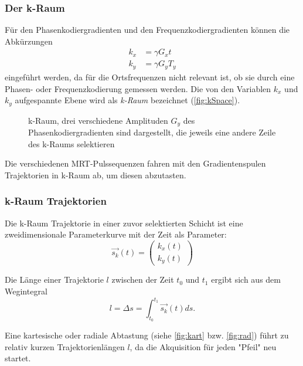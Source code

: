 \subsubsection{Der k-Raum}
Für den Phasenkodiergradienten und den Frequenzkodiergradienten können die Abkürzungen
\begin{subequations}
	\label{eq:kSpaceEq}
	\begin{align}
	k_x & = \gamma G_x t \\
	k_y & = \gamma G_y T_y 
	\end{align}
\end{subequations}
eingeführt werden\cite[S.~333]{Doessel2016}, da für die Ortsfrequenzen nicht relevant ist, ob sie durch eine Phasen- oder Frequenzkodierung gemessen werden. Die von den Variablen $k_x$ und $k_y$ aufgespannte Ebene wird als \textit{k-Raum} bezeichnet (\autoref{fig:kSpace}).

\begin{figure}[H]
	\centering
	\caption[k-Raum]{k-Raum, drei verschiedene Amplituden $G_y$ des Phasenkodiergradienten sind dargestellt, die jeweils eine andere Zeile des k-Raums selektieren}
	\label{fig:kSpace}
\end{figure} 

Die verschiedenen MRT-Pulssequenzen fahren mit den Gradientenspulen Trajektorien in k-Raum ab, um diesen abzutasten.

\subsubsection{k-Raum Trajektorien}
Die k-Raum Trajektorie in einer zuvor selektierten Schicht ist eine zweidimensionale Parameterkurve mit der Zeit als Parameter:
\begin{equation}
\vec{s_k}(t)=\begin{pmatrix}k_x(t) \\ k_y(t)\end{pmatrix}
\end{equation}

Die Länge einer Trajektorie $l$ zwischen der Zeit $t_0$ und $t_1$ ergibt sich aus dem Wegintegral
\begin{equation}
l=\Delta s = \int_{t_0}^{t_1} \vec{s_k}(t) ds.
\end{equation}

Eine kartesische oder radiale Abtastung (siehe \autoref{fig:kart} bzw. \autoref{fig:rad}) führt zu relativ kurzen Trajektorienlängen $l$, da die Akquisition für jeden "Pfeil" neu startet.


